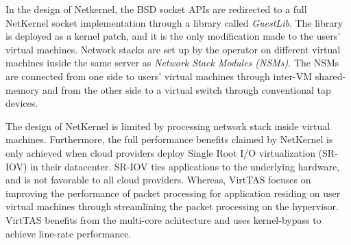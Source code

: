 In the design of Netkernel, the BSD socket APIs are redirected to a full NetKernel socket implementation through 
a library called \emph{GuestLib}. The library is deployed as a kernel patch, and it is 
the only modification made to the users' virtual machines. Network stacks 
are set up by the operator on different virtual machines inside the same server as \emph{Network Stack Modules (NSMs)}. 
The NSMs are connected from one side to users' virtual machines through inter-VM shared-memory 
and from the other side to a virtual switch through conventional tap devices. 


The design of NetKernel is limited by 
processing network stack inside virtual machines. Furthermore, the full 
performance benefits claimed by NetKernel is only achieved when cloud providers deploy 
Single Root I/O virtualization (SR-IOV) in their datacenter. SR-IOV ties applications to the underlying hardware, and 
is not favorable to all cloud providers. Whereas, VirtTAS focuses on improving the performance of 
packet processing for application residing on user virtual machines through streamlining the packet 
processing on the hypervisor. VirtTAS benefits from the multi-core achitecture and uses kernel-bypass to 
achieve line-rate performance.

